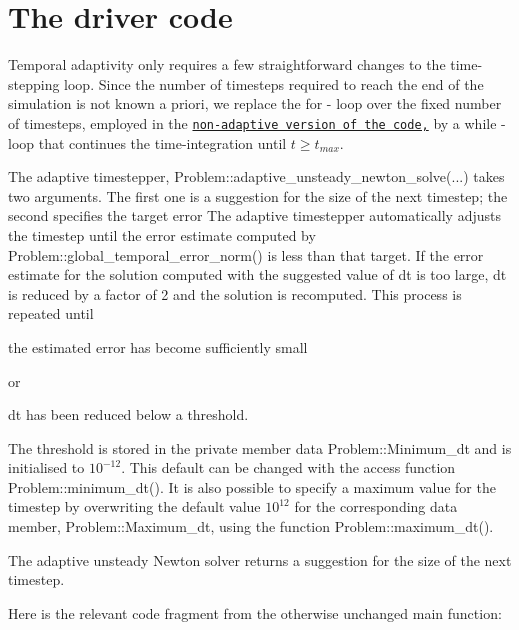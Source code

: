  

\hypertarget{index_main}{}\section{The driver code}\label{index_main}
Temporal adaptivity only requires a few straightforward changes to the time-\/stepping loop. Since the number of timesteps required to reach the end of the simulation is not known a priori, we replace the {\ttfamily for} -\/ loop over the fixed number of timesteps, employed in the \href{../../two_d_unsteady_heat/html/index.html}{\tt non-\/adaptive version of the code,} by a {\ttfamily while} -\/ loop that continues the time-\/integration until $ t \ge t_{max}$.

The adaptive timestepper, {\ttfamily Problem\+::adaptive\+\_\+unsteady\+\_\+newton\+\_\+solve}(...) takes two arguments. The first one is a suggestion for the size of the next timestep; the second specifies the target error The adaptive timestepper automatically adjusts the timestep until the error estimate computed by {\ttfamily Problem\+::global\+\_\+temporal\+\_\+error\+\_\+norm()} is less than that target. If the error estimate for the solution computed with the suggested value of {\ttfamily dt} is too large, {\ttfamily dt} is reduced by a factor of 2 and the solution is recomputed. This process is repeated until
\begin{DoxyItemize}
\item the estimated error has become sufficiently small
\end{DoxyItemize}or
\begin{DoxyItemize}
\item {\ttfamily dt} has been reduced below a threshold.
\end{DoxyItemize}The threshold is stored in the private member data {\ttfamily Problem\+::\+Minimum\+\_\+dt} and is initialised to $ 10^{-12} $. This default can be changed with the access function {\ttfamily Problem\+::minimum\+\_\+dt()}. It is also possible to specify a maximum value for the timestep by overwriting the default value $ 10^{12} $ for the corresponding data member, {\ttfamily Problem\+::\+Maximum\+\_\+dt}, using the function {\ttfamily Problem\+::maximum\+\_\+dt()}.

The adaptive unsteady Newton solver returns a suggestion for the size of the next timestep.

Here is the relevant code fragment from the otherwise unchanged {\ttfamily main} function\+:

